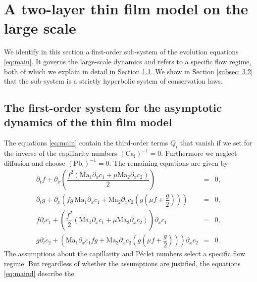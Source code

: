 \documentclass[11pt]{article}
\numberwithin{equation}{section}
\newtheorem{counter example}[theorem]{Counter Example}
\begin{document}
{\section{A two-layer thin film model on the large scale}\label{sec: 3}
We identify in this section a first-order sub-system of the evolution equations 
\eqref{eq:main}. It governs the large-scale
dynamics and refers to a specific flow regime,  both of which we explain in detail 
in Section \ref{subsec:reduction}.  We show in Section \ref{subsec: 3.2} that the sub-system is a strictly hyperbolic system of conservation laws\cite{dafermos2005hyperbolic}.

\subsection{The first-order system for the asymptotic dynamics of the thin film model}\label{subsec:reduction}
The equations \eqref{eq:main} contain the 
third-order terms $Q_i$ that vanish if we set for the inverse of the capillarity numbers  $ (\mathrm{Ca_i})^{-1}=0$.  Furthermore we neglect diffusion and choose $ (\mathrm{Pb_i})^{-1}=0$. 
The remaining equations are given by 
\begin{equation}\label{eq:maind}
\begin{array}{rcl}
  \partial_t f
  +\partial_x \left(\dfrac{f^2(\mathrm{Ma_1} \partial_x c_1+\mu \mathrm{Ma_2}\partial_x c_2)}{2}\right)
  &=&%
  {0,}%
  \\[1.9ex]
%
  \partial_t g
  +\partial_x\left(
      fg\,\mathrm{Ma_1} \partial_x c_1
      +\mathrm{Ma_2}\partial_x c_2\left(g\left(\mu f+\dfrac{g}{2}\right)\right)
    \right)
  &=&{0,}%
  \\[1.9ex]
%
 f\partial_t c_1
  +\left(\dfrac{f^2}{2}
      \left(\mathrm{Ma_1} \partial_x c_1+\mu \mathrm{Ma_2}\partial_x c_2\right)\right)\partial_x c_1 &=&0,
 \\[1.9ex]
%
  g\partial_t c_2
  +\left(
      \mathrm{Ma_1} \partial_x c_1fg
      +\mathrm{Ma_2}\partial_x c_2\left(g\left(\mu f+\dfrac{g}{2}\right)\right)
    \right)\partial_x c_2
  & =&0.
\end{array}
\end{equation}
%
The assumptions about the capillarity 
and  P\'{e}clet numbers select a specific flow regime. But regardless of whether the assumptions are justified, the equations \eqref{eq:maind} describe the 
}
\end{document}
